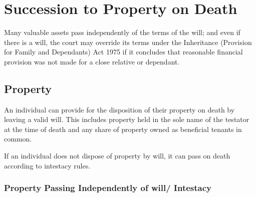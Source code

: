 \documentclass[
]{article}
\begin{document}
\hypertarget{succession-to-property-on-death}{%
\section{Succession to Property on
Death}\label{succession-to-property-on-death}}

Many valuable assets pass independently of the terms of the will; and
even if there is a will, the court may override its terms under the
Inheritance (Provision for Family and Dependants) Act 1975 if it
concludes that reasonable financial provision was not made for a close
relative or dependant.

\hypertarget{property}{%
\subsection{Property}\label{property}}

An individual can provide for the disposition of their property on death
by leaving a valid will. This includes property held in the sole name of
the testator at the time of death and any share of property owned as
beneficial tenants in common.

If an individual does not dispose of property by will, it can pass on
death according to intestacy rules.

\hypertarget{property-passing-independently-of-will-intestacy}{%
\subsubsection{Property Passing Independently of will/
Intestacy}\label{property-passing-independently-of-will-intestacy}}
\end{document}
